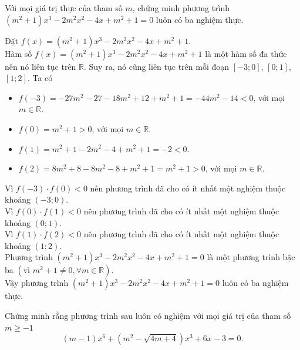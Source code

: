 \begin{vd}%
	Với mọi giá trị thực của tham số $m$, chứng minh phương trình $\left(m^2+1\right)x^3-2m^2x^2-4x+m^2+1=0$ luôn có ba nghiệm thực.
	\loigiai
	{
		Đặt $f(x)=\left(m^2+1\right)x^3-2m^2x^2-4x+m^2+1$.\\
		Hàm số $f(x)=\left(m^2+1\right)x^3-2m^2x^2-4x+m^2+1$ là một hàm số đa thức nên nó liên tục trên $\mathbb{R}$. Suy ra, nó cũng liên tục trên mỗi đoạn $[-3;0]$, $[0;1]$, $[1;2]$.
		Ta có
		\begin{itemize}
			\item $f(-3) =-27m^2-27-18m^2+12+m^2+1=-44m^2-14<0$, với mọi $m\in\mathbb{R}$.
			\item $f(0)=m^2+1>0$, với mọi $m\in\mathbb{R}$.
			\item $f(1)=m^2+1-2m^2-4+m^2+1=-2<0$.
			\item $f(2)=8m^2+8-8m^2-8+m^2+1=m^2+1>0$, với mọi $m\in\mathbb{R}$.
		\end{itemize}
		Vì $f(-3)\cdot f(0)<0$ nên phương trình đã cho có ít nhất một nghiệm thuộc khoảng $(-3;0)$.\\
		Vì $f(0)\cdot f(1)<0$ nên phương trình đã cho có ít nhất một nghiệm thuộc khoảng $(0;1)$.\\
		Vì $f(1)\cdot f(2)<0$ nên phương trình đã cho có ít nhất một nghiệm thuộc khoảng $(1;2)$.\\
		Phương trình $\left(m^2+1\right)x^3-2m^2x^2-4x+m^2+1=0$ là một phương trình bậc ba $(\text{vì } m^2+1\neq 0,\forall m\in\mathbb{R})$.\\
		Vậy phương trình $\left(m^2+1\right)x^3-2m^2x^2-4x+m^2+1=0$ luôn có ba nghiệm thực.
	}
\end{vd}
\begin{vd}%
	Chứng minh rằng phương trình sau luôn có nghiệm với mọi giá trị của tham số $m\ge -1$
	\[ (m-1)x^6+\left(m^2-\sqrt{4m+4}\right)x^3+6x-3=0. \]
\end{vd}
